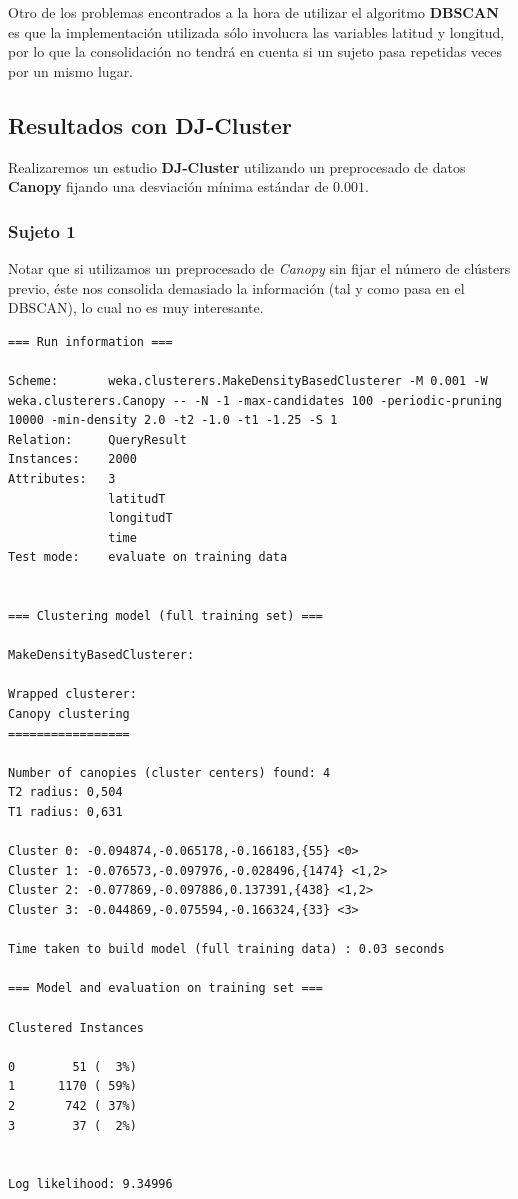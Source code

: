 \documentclass[a4paper, 12pt]{article}
\begin{document}
Otro de los problemas encontrados a la hora de utilizar el algoritmo \textbf{DBSCAN} es que la implementaci\'on utilizada s\'olo involucra las variables latitud y longitud, por lo que la consolidaci\'on no tendr\'a en cuenta si un sujeto pasa repetidas veces por un mismo lugar.\\

\subsection{Resultados con DJ-Cluster}

Realizaremos un estudio \textbf{DJ-Cluster} utilizando un preprocesado de datos \textbf{Canopy} fijando una desviaci\'on m\'inima est\'andar de $0.001$. \\


\subsubsection{Sujeto 1}

Notar que si utilizamos un preprocesado de \textit{Canopy} sin fijar el n\'umero de cl\'usters previo, \'este nos consolida demasiado la informaci\'on (tal y como pasa en el DBSCAN), lo cual no es muy interesante.

\begin{verbatim}
=== Run information ===

Scheme:       weka.clusterers.MakeDensityBasedClusterer -M 0.001 -W weka.clusterers.Canopy -- -N -1 -max-candidates 100 -periodic-pruning 10000 -min-density 2.0 -t2 -1.0 -t1 -1.25 -S 1
Relation:     QueryResult
Instances:    2000
Attributes:   3
              latitudT
              longitudT
              time
Test mode:    evaluate on training data


=== Clustering model (full training set) ===

MakeDensityBasedClusterer: 

Wrapped clusterer: 
Canopy clustering
=================

Number of canopies (cluster centers) found: 4
T2 radius: 0,504     
T1 radius: 0,631     

Cluster 0: -0.094874,-0.065178,-0.166183,{55} <0>
Cluster 1: -0.076573,-0.097976,-0.028496,{1474} <1,2>
Cluster 2: -0.077869,-0.097886,0.137391,{438} <1,2>
Cluster 3: -0.044869,-0.075594,-0.166324,{33} <3>

Time taken to build model (full training data) : 0.03 seconds

=== Model and evaluation on training set ===

Clustered Instances

0        51 (  3%)
1      1170 ( 59%)
2       742 ( 37%)
3        37 (  2%)


Log likelihood: 9.34996
\end{verbatim}
\end{document}
